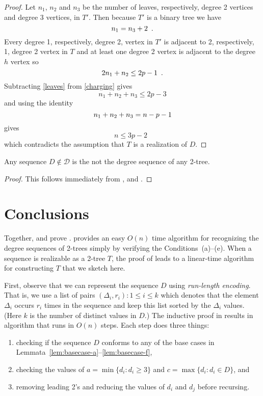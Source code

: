 \documentclass[lotsofwhite,charterfonts]{patmorin}
\begin{document}
\begin{proof}
{{Let $n_1$, $n_2$ and $n_3$ be the number of leaves, respectively, degree 2
vertices and degree 3 vertices, in $T'$.  Then because $T'$ is a
binary tree we have 
\begin{equation}
   n_1=n_3+2 \enspace . \eqlabel{leaves} 
\end{equation}
Every degree 1, respectively, degree 2, vertex in $T'$ is adjacent to
2, respectively, 1, degree 2 vertex in $T$ and at least one degree 2
vertex is adjacent to the degree $h$ vertex so
\begin{equation}
   2n_1 + n_2 \le 2p-1  \enspace . \eqlabel{charging}
\end{equation} 
Subtracting \eqref{leaves} from \eqref{charging} gives
\[
    n_1 + n_2 + n_3 \le 2p-3
\]
and using the identity 
\begin{equation}
     n_1+n_2+n_3 = n-p-1 \eqlabel{size}
\end{equation}
gives
\[
     n \le 3p-2 \enspace 
\]
which contradicts the assumption that $T$ is a realization of $D$.}}
\end{proof}

\begin{lem}
Any sequence $D\not\in \mathcal{D}$ is the not the degree sequence of
any 2-tree.
\end{lem}

\begin{proof}
This follows immediately from ,  and
.
\end{proof}

\section{Conclusions}

Together,  and  prove .
 provides an easy $O(n)$ time algorithm for recognizing
the degree sequences of 2-trees simply by verifying the
Conditions~(a)--(e).  When a sequence is realizable as a 2-tree $T$,
the proof of  leads to a linear-time algorithm for
constructing $T$ that we sketch here.

First, observe that we can represent the sequence $D$ using
\emph{run-length encoding}.  That is, we use a list of pairs
$(\Delta_i,r_i):1\le i\le k$ which denotes that the element $\Delta_i$
occurs $r_i$ times in the sequence and keep this list sorted by the
$\Delta_i$ values. (Here $k$ is the number of distinct values in $D$.)
The inductive proof in  results in algorithm that runs in
$O(n)$ steps.  Each step does three things:
\begin{enumerate}
\item checking if the sequence $D$ conforms to any of the base cases
in Lemmata~\ref{lem:basecase-a}--\ref{lem:basecase-f},
\item checking the values of $a=\min\{d_i: d_i\ge 3\}$ and
$c=\max\{d_i:d_i\in D\}$, and 
\item removing leading 2's and reducing the values of 
$d_i$ and $d_j$ before recursing.
\end{enumerate}
\end{document}
